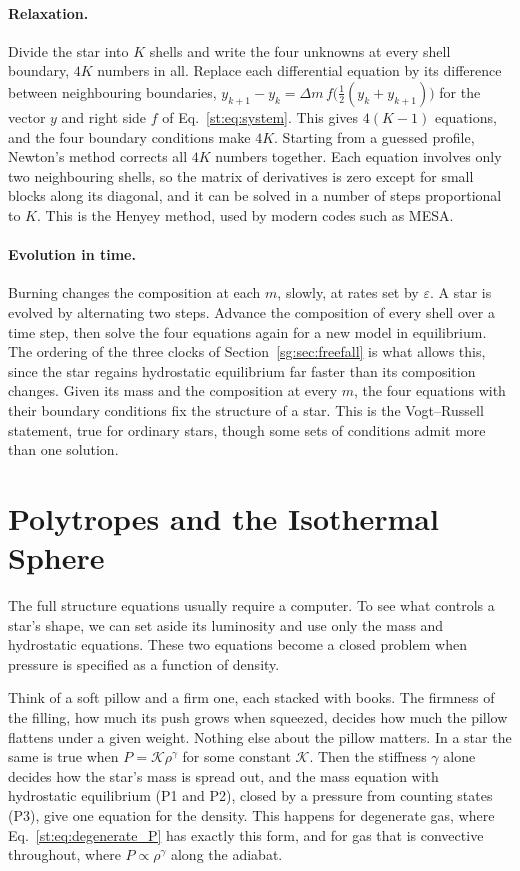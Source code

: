 \paragraph{Relaxation.} Divide the star into $K$ shells and write the four unknowns at every shell boundary, $4K$ numbers in all. Replace each differential equation by its difference between neighbouring boundaries, $y_{k+1}-y_k=\Delta m\,f\big(\tfrac12(y_k+y_{k+1})\big)$ for the vector $y$ and right side $f$ of Eq.~\eqref{st:eq:system}. This gives $4(K-1)$ equations, and the four boundary conditions make $4K$. Starting from a guessed profile, Newton's method corrects all $4K$ numbers together. Each equation involves only two neighbouring shells, so the matrix of derivatives is zero except for small blocks along its diagonal, and it can be solved in a number of steps proportional to $K$. This is the Henyey method, used by modern codes such as MESA.

\paragraph{Evolution in time.} Burning changes the composition at each $m$, slowly, at rates set by $\varepsilon$. A star is evolved by alternating two steps. Advance the composition of every shell over a time step, then solve the four equations again for a new model in equilibrium. The ordering of the three clocks of Section~\ref{sg:sec:freefall} is what allows this, since the star regains hydrostatic equilibrium far faster than its composition changes. Given its mass and the composition at every $m$, the four equations with their boundary conditions fix the structure of a star. This is the Vogt–Russell statement, true for ordinary stars, though some sets of conditions admit more than one solution.

\section{Polytropes and the Isothermal Sphere}
\label{st:sec:polytropes}

The full structure equations usually require a computer. To see what controls a star's shape, we can set aside its luminosity and use only the mass and hydrostatic equations. These two equations become a closed problem when pressure is specified as a function of density.

Think of a soft pillow and a firm one, each stacked with books. The firmness of the filling, how much its push grows when squeezed, decides how much the pillow flattens under a given weight. Nothing else about the pillow matters. In a star the same is true when $P=\mathcal K\rho^\gamma$ for some constant $\mathcal K$. Then the stiffness $\gamma$ alone decides how the star's mass is spread out, and the mass equation with hydrostatic equilibrium (P1 and P2), closed by a pressure from counting states (P3), give one equation for the density. This happens for degenerate gas, where Eq.~\eqref{st:eq:degenerate_P} has exactly this form, and for gas that is convective throughout, where $P\propto\rho^\gamma$ along the adiabat.

